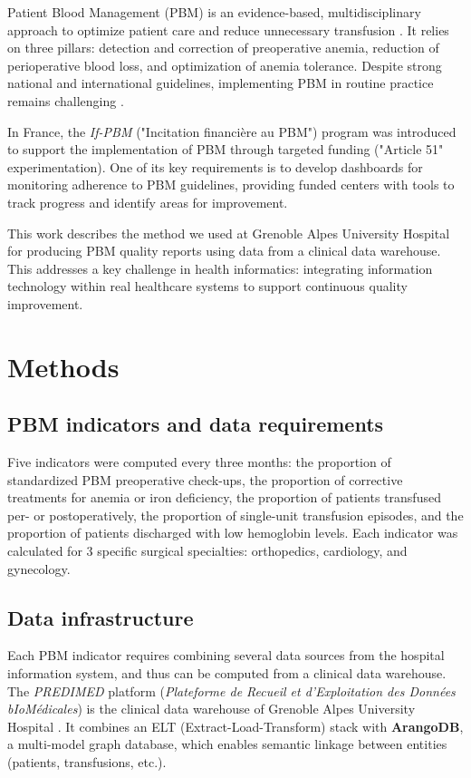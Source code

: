 \documentclass{IOS-Book-Article}
\begin{document}
Patient Blood Management (PBM) is an evidence-based, multidisciplinary approach to
optimize patient care and reduce unnecessary transfusion \cite{shander2022global}. 
It relies on three pillars: detection and correction of preoperative anemia, reduction 
of perioperative blood loss, and optimization of anemia tolerance. 
Despite strong national \cite{theissen2024perioperative} and international \cite{tibi2021sts} 
guidelines, implementing PBM in routine practice remains challenging \cite{godonReductionRedBlood2024}.

In France, the \textit{If-PBM} ("Incitation financière au PBM") program was introduced 
to support the implementation of PBM through targeted funding ("Article 51" experimentation). 
One of its key requirements is to develop dashboards for monitoring adherence to 
PBM guidelines, providing funded centers with tools to track progress and identify areas
for improvement.

This work describes the method we used at Grenoble Alpes University Hospital for 
producing PBM quality reports using data from a clinical data warehouse. 
This addresses a key challenge in health informatics: integrating information 
technology within real healthcare systems to support continuous quality improvement.

\section{Methods}

\subsection{PBM indicators and data requirements}

Five indicators were computed every three months: the proportion of standardized PBM preoperative check-ups,
 the proportion of corrective treatments for anemia or iron deficiency, the proportion of patients 
 transfused per- or postoperatively, the proportion of single-unit transfusion episodes, and the 
 proportion of patients discharged with low hemoglobin levels. Each indicator was calculated for 3 
 specific surgical specialties: orthopedics, cardiology, and gynecology. 

\subsection{Data infrastructure}

Each PBM indicator requires combining several data sources from the hospital information system, and thus
can be computed from a clinical data warehouse.
The \textit{PREDIMED} platform (\textit{Plateforme de Recueil et d'Exploitation des Données bIoMédicales})
 is the clinical data warehouse of Grenoble Alpes University Hospital \cite{Artemova2019}. 
 It combines an ELT (Extract-Load-Transform) stack with \textbf{ArangoDB}, a multi-model graph database, 
 which enables semantic linkage between entities (patients, transfusions, etc.).
\end{document}
